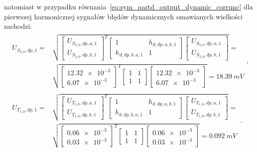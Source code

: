 natomiast w przypadku równania~\eqref{eq:sym_partd_output_dynamic_corrunc} dla pierwszej harmonicznej sygnałów błędów dynamicznych omawianych wielkości zachodzi:
\begin{gather}
\begin{split}
U_{S_{2,0},dp,1} = & \sqrt{
\begin{bmatrix}
U_{S_{2,0},dp,a,1} \\ U_{S_{2,0},dp,b,1}
\end{bmatrix}^{T}
\begin{bmatrix}
1 & h_{d,dp,a,b,1} \\
h_{d,dp,b,a,1} & 1
\end{bmatrix}
\begin{bmatrix}
U_{S_{2,0},dp,a,1} \\ U_{S_{2,0},dp,b,1}
\end{bmatrix}} = \\ & \sqrt{
\begin{bmatrix}
\num{12.32e-3} \\ \num{6.07e-3}
\end{bmatrix}^{T}
\begin{bmatrix}
1 & 1 \\
1 & 1
\end{bmatrix}
\begin{bmatrix}
\num{12.32e-3} \\ \num{6.07e-3}
\end{bmatrix}} = \qty{18.39}{mV}
\end{split}
\label{eq:sym_partd_output_dynamic_corrunc_S_2_0}, \\
\begin{split}
U_{T_{1,0},dp,1} = & \sqrt{
\begin{bmatrix}
U_{T_{1,0},dp,a,1} \\ U_{T_{1,0},dp,b,1}
\end{bmatrix}^{T}
\begin{bmatrix}
1 & h_{d,dp,a,b,1} \\
h_{d,dp,b,a,1} & 1
\end{bmatrix}
\begin{bmatrix}
U_{T_{1,0},dp,a,1} \\ U_{T_{1,0},dp,b,1}
\end{bmatrix}} = \\ & \sqrt{
\begin{bmatrix}
\num{0.06e-3} \\ \num{0.03e-3}
\end{bmatrix}^{T}
\begin{bmatrix}
1 & 1 \\
1 & 1
\end{bmatrix}
\begin{bmatrix}
\num{0.06e-3} \\ \num{0.03e-3}
\end{bmatrix}} = \qty{0.092}{mV}
\end{split}
\label{eq:sym_partd_output_dynamic_corrunc_T_1_0}.
\end{gather}
